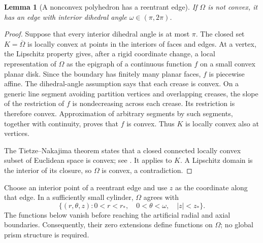 \documentclass[11pt,a4paper]{article}
\newtheorem{lemma}[theorem]{Lemma}
\theoremstyle{remark}
\numberwithin{equation}{section}
\begin{document}
\begin{lemma}[A nonconvex polyhedron has a reentrant edge]\label{lem:reentrant}
If $\Omega$ is not convex, it has an edge with interior dihedral angle
$\omega\in(\pi,2\pi)$.
\end{lemma}
\begin{proof}
Suppose that every interior dihedral angle is at most $\pi$.
The closed set $K=\overline\Omega$ is locally convex at points in the
interiors of faces and edges.  At a vertex, the Lipschitz property gives,
after a rigid coordinate change, a local representation of $\Omega$ as
the epigraph of a continuous function $f$ on a small convex planar disk.
Since the boundary has finitely many planar faces, $f$ is piecewise affine.
The dihedral-angle assumption says that each crease is convex.  On a
generic line segment avoiding partition vertices and overlapping creases,
the slope of the restriction of $f$ is nondecreasing across each crease.
Its restriction is therefore convex.  Approximation of arbitrary segments
by such segments, together with continuity, proves that $f$ is convex.
Thus $K$ is locally convex also at vertices.

The Tietze--Nakajima theorem states that a closed connected locally convex
subset of Euclidean space is convex; see \cite[Theorem 1]{BjorndahlKarshon2010}.
It applies to $K$.  A Lipschitz domain is the interior of its closure, so
$\Omega$ is convex, a contradiction.
\end{proof}

Choose an interior point of a reentrant edge and use $z$ as the coordinate
along that edge.  In a sufficiently small cylinder, $\Omega$ agrees with
\[
 \{(r,\theta,z):0<r<r_*,\quad 0<\theta<\omega,\quad |z|<z_*\}.
\]
The functions below vanish before reaching the artificial radial and axial
boundaries.  Consequently, their zero extensions define functions on
$\Omega$; no global prism structure is required.
\end{document}
